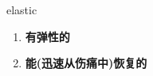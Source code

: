 
\begin{frame}
{\huge elastic}
\begin{center}
\begin{enumerate}\Large
  \item \textbf{有弹性的}
  \item \textbf{能(迅速从伤痛中)恢复的}
\end{enumerate}
\end{center}
\end{frame}
